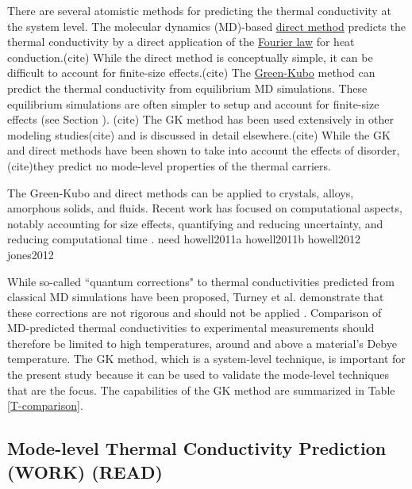 There are several atomistic methods for predicting the thermal 
conductivity at the system level. The molecular dynamics (MD)-based 
\href{http://lammps.sandia.gov/doc/fix_thermal_conductivity.html}
{direct method} predicts the thermal conductivity by a direct 
application of the 
\href{http://en.wikipedia.org/wiki/Thermal_conduction#Fourier.27s_law}
{Fourier law} for heat conduction.(cite) While the direct method 
is conceptually simple, it can be difficult to account for finite-size 
effects.(cite) The 
\href{http://lammps.sandia.gov/doc/compute_heat_flux.html}{Green-Kubo}
method can predict the thermal conductivity from equilibrium MD 
simulations. These equilibrium simulations are often simpler 
to setup and account for finite-size effects (see Section ).
(cite) The GK method has been used extensively in other modeling 
studies(cite) and is discussed in detail elsewhere.(cite) 
While the GK  and direct methods have been shown to take into 
account the effects of disorder,(cite)they predict no mode-level 
properties of the thermal carriers. 

The Green-Kubo and direct methods can be applied to crystals, alloys, 
amorphous solids, and fluids. Recent work has focused on computational 
aspects, notably accounting for size effects, quantifying and reducing 
uncertainty, and reducing computational time 
\cite{landry_complex_2008,buongiorno_benchmark_2009,
chen_how_2010,sellan_size_2010,he_lattice_2012}.
need howell2011a howell2011b howell2012 jones2012

While so-called ``quantum corrections" to 
thermal conductivities predicted from classical MD simulations have been 
proposed, Turney et al. demonstrate that these corrections are not 
rigorous and should not be applied \cite{turney_assessing_2009}. 
Comparison of MD-predicted thermal conductivities to experimental 
measurements should 
therefore be limited to high temperatures, around and above a material's 
Debye temperature. The GK method, which is a system-level technique, 
is important for the present study because it can be used to validate 
the mode-level techniques that are the focus. The capabilities 
of the GK method are summarized in Table \ref{T-comparison}.


\subsection{\label{S-kbottomup} Mode-level Thermal Conductivity 
Prediction (WORK) (READ)}

